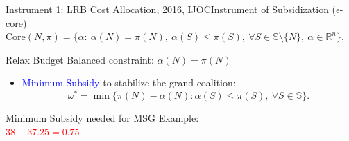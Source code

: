 \documentclass[14pt]{beamer}
\newcommand{\R}{\mathbb{R}}
\begin{document}
\begin{frame}{Instrument 1: LRB Cost Allocation, {\footnotesize 2016, IJOC}}{Instrument of Subsidization ($\epsilon$-core)}
\vspace{3mm}
{\footnotesize $\mathrm{Core}(N,\pi) = \bigg\{ \alpha:~ \alpha(N)=\pi(N), ~\alpha(S) \leq \pi(S), ~\forall S \in \mathbb{S} \setminus \{N\},~\alpha \in \R^n   \bigg\}$.}

\begin{shaded}
\centering Relax Budget Balanced constraint: $\alpha(N) = \pi(N)$
\end{shaded}
\begin{itemize}
\item \textcolor{blue}{Minimum Subsidy} to stabilize the grand coalition:
\begin{equation*}
\omega^* = \min \big\{ \pi(N) - \alpha(N): \alpha(S) \leq \pi(S), ~\forall S \in \mathbb{S} \big\}.
\end{equation*}
\end{itemize}
\pause
\vspace{-7mm}
\begin{shaded}
\centering
\small
Minimum Subsidy needed for MSG Example:\\ 
\vspace{2mm}
\textcolor{red}{$38-37.25 = 0.75$}
\end{shaded}
\end{frame}
\end{document}
